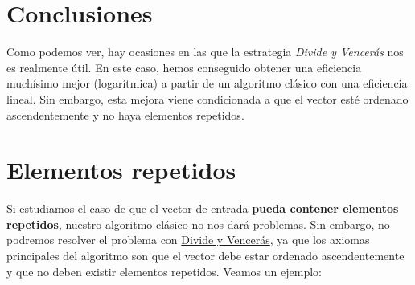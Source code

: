 \documentclass[12pt,spanish]{article}
\begin{document}
\newpage

\section{Conclusiones}

Como podemos ver, hay ocasiones en las que la estrategia \emph{Divide y Vencerás} nos es realmente útil. En este caso, hemos conseguido obtener una eficiencia muchísimo mejor (logarítmica) a partir de un algoritmo clásico con una eficiencia lineal. Sin embargo, esta mejora viene condicionada a que el vector esté ordenado ascendentemente y no haya elementos repetidos.

\section{Elementos repetidos}

Si estudiamos el caso de que el vector de entrada \textbf{pueda contener elementos repetidos}, nuestro \textcolor{blue!60}{\hyperref[alg:clasico]{algoritmo clásico}} no nos dará problemas. Sin embargo, no podremos resolver el problema con \textcolor{blue!60}{\hyperref[alg:dyv]{Divide y Vencerás}}, ya que los axiomas principales del algoritmo son que el vector debe estar ordenado ascendentemente y que no deben existir elementos repetidos. Veamos un ejemplo:

\begin{figure}[H]
\centering
{}

\end{figure}
\end{document}
